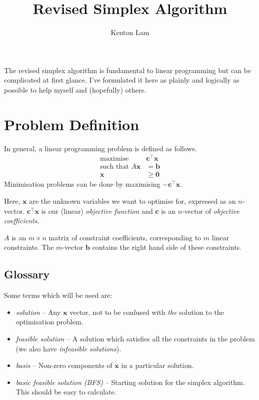 \documentclass[11pt,a4paper]{article} %
\title{Revised Simplex Algorithm}
\author{Kenton Lam}
\begin{document}
\maketitle

The revised simplex algorithm is fundamental to 
linear programming but can be complicated at first glance.
I've formulated it here as plainly and logically as possible 
to help myself and (hopefully) others.


\section{Problem Definition}
In general, a linear programming problem is defined as follows. 
\begin{align*}
    \text{maximise }&\bm c^\top \bm x \\ 
    \text{such that } A\bm x &= \bm b \\ 
    \bm x &\ge \bm 0
\end{align*}
Minimisation problems can be done by maximising $-\bm c^\top \bm x$.

Here, $\bm x$ are the unknown variables we want to optimise for, 
expressed as an $n$-vector. 
$\bm c^\top \bm x$ is our (linear) \textit{objective function} and $\bm c$ 
is an $n$-vector of \textit{objective coefficients}.

$A$ is an $m\times n$ matrix of constraint coefficients, 
corresponding to $m$ linear constraints. The $m$-vector $\bm b$ 
contains the right hand side of these constraints.

\subsection{Glossary}
Some terms which will be used are:
\begin{itemize}
    \item \textit{solution} -- Any $\bm x$ vector, not to be confused with \textit{the} solution to the optimisation problem.
    \item \textit{feasible solution} -- A solution which satisfies all the constraints in the problem (we also have \textit{infeasible solutions}).
    \item \textit{basis} -- Non-zero components of $\bm x$ in a particular solution.
    \item \textit{basic feasible solution (BFS)} -- Starting solution for the simplex algorithm.
    This should be easy to calculate. 
\end{itemize}
\end{document}

